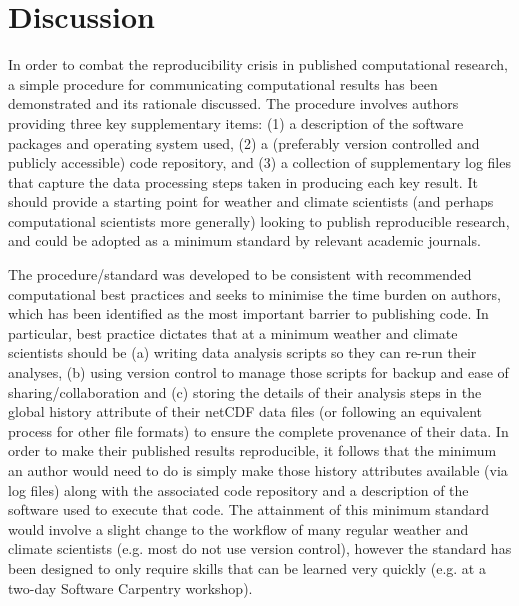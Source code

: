 
\section{Discussion}

In order to combat the reproducibility crisis in published computational research, a simple procedure for communicating computational results has been demonstrated and its rationale discussed. The procedure involves authors providing three key supplementary items: (1) a description of the software packages and operating system used, (2) a (preferably version controlled and publicly accessible) code repository, and (3) a collection of supplementary log files that capture the data processing steps taken in producing each key result. It should provide a starting point for weather and climate scientists (and perhaps computational scientists more generally) looking to publish reproducible research, and could be adopted as a minimum standard by relevant academic journals.

The procedure/standard was developed to be consistent with recommended computational best practices and seeks to minimise the time burden on authors, which has been identified as the most important barrier to publishing code. In particular, best practice dictates that at a minimum weather and climate scientists should be (a) writing data analysis scripts so they can re-run their analyses, (b) using version control to manage those scripts for backup and ease of sharing/collaboration and (c) storing the details of their analysis steps in the global history attribute of their netCDF data files (or following an equivalent process for other file formats) to ensure the complete provenance of their data. In order to make their published results reproducible, it follows that the minimum an author would need to do is simply make those history attributes available (via log files) along with the associated code repository and a description of the software used to execute that code. The attainment of this minimum standard would involve a slight change to the workflow of many regular weather and climate scientists (e.g. most do not use version control), however the standard has been designed to only require skills that can be learned very quickly (e.g. at a two-day Software Carpentry workshop).  

